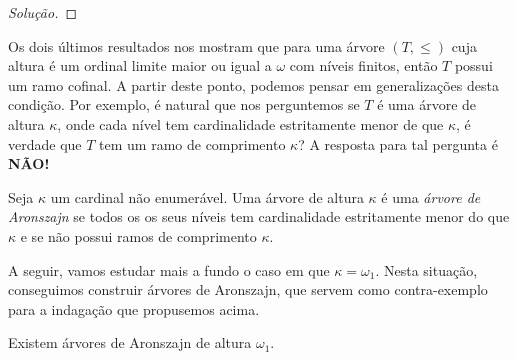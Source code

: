 \documentclass[a4paper]{article}
\begin{document}
\begin{proof}[Solução]
  
  \end{proof}
  

  Os dois últimos resultados nos mostram que para uma árvore \((T,\leq)\) cuja altura é um
  ordinal limite maior ou igual a \(\omega\) com níveis finitos, então \(T\)
  possui um ramo cofinal. A partir deste ponto, podemos pensar em generalizações
  desta condição. Por exemplo, é natural que nos perguntemos se $T$ é uma árvore
  de altura $\kappa$, onde cada nível tem cardinalidade estritamente menor de
  que \(\kappa\), é verdade que $T$ tem um
  ramo de comprimento $\kappa$?  A resposta para tal pergunta é \textbf{NÃO!}

  \begin{definition}
    Seja \(\kappa\) um cardinal não enumerável.
    Uma árvore de altura $\kappa$ é uma \textit{árvore de Aronszajn} se
    todos os os seus níveis tem cardinalidade estritamente menor do que \(\kappa\)
    e se não possui ramos de comprimento $\kappa$.
  \end{definition}

 A seguir, vamos estudar mais a fundo o caso em que \(\kappa=\omega_1\). Nesta
  situação, conseguimos construir árvores de Aronszajn, que servem como
  contra-exemplo  para a indagação que propusemos acima.
  
\begin{teo}
  Existem árvores de Aronszajn de altura $\omega_1$.
\end{teo}
\end{document}
